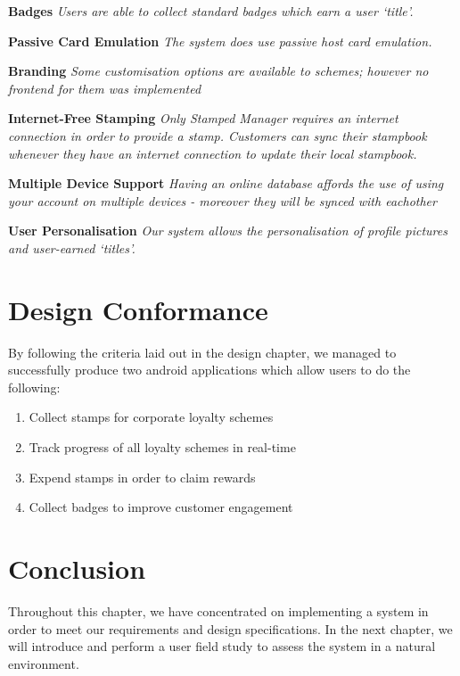 \begin{description}[leftmargin=!,labelwidth=\widthof{\bfseries Medium}]
    \item[S3] \textbf{Badges} \newline
        \textit{Users are able to collect standard badges which earn a user `title'.}
     	
    \item[C1] \textbf{Passive Card Emulation} \newline
        \textit{The system does use passive host card emulation.}

    \item[C2] \textbf{Branding} \newline
        \textit{Some customisation options are available to schemes; however no frontend for them was implemented}

    \item[C3] \textbf{Internet-Free Stamping} \newline
        \textit{Only Stamped Manager requires an internet connection in order to provide a stamp. Customers can sync their stampbook whenever they have an internet connection to update their local stampbook.}
        
    \item[C4] \textbf{Multiple Device Support} \newline
        \textit{Having an online database affords the use of using your account on multiple devices - moreover they will be synced with eachother}
        
    \item[C5] \textbf{User Personalisation} \newline
        \textit{Our system allows the personalisation of profile pictures and user-earned `titles'.}
\end{description}

\newpage

\section{Design Conformance}
By following the criteria laid out in the design chapter, we managed to successfully produce two android applications which allow users to do the following:

\begin{enumerate}
	\item Collect stamps for corporate loyalty schemes
	\item Track progress of all loyalty schemes in real-time
	\item Expend stamps in order to claim rewards
	\item Collect badges to improve customer engagement
\end{enumerate} 

\section{Conclusion}
Throughout this chapter, we have concentrated on implementing a system in order to meet our requirements and design specifications. In the next chapter, we will introduce and perform a user field study to assess the system in a natural environment.